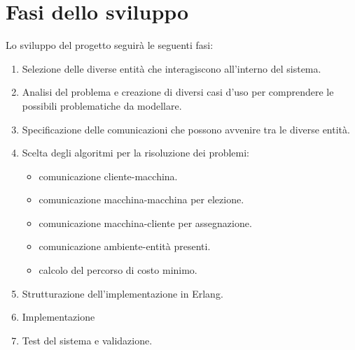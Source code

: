 \section{Fasi dello sviluppo}
Lo sviluppo del progetto seguirà le seguenti fasi:
\begin{enumerate}
	\item Selezione delle diverse entità che interagiscono all'interno del sistema.
	\item Analisi del problema e creazione di diversi casi d'uso per comprendere le possibili problematiche da modellare.
	\item Specificazione delle comunicazioni che possono avvenire tra le diverse entità.
	\item Scelta degli algoritmi per la risoluzione dei problemi: 
		\begin{itemize}
			\item comunicazione cliente-macchina.
			\item comunicazione macchina-macchina per elezione.
			\item comunicazione macchina-cliente per assegnazione.
			\item comunicazione ambiente-entità presenti.
			\item calcolo del percorso di costo minimo.
		\end{itemize}
	\item Strutturazione dell'implementazione in Erlang.
	\item Implementazione
	\item Test del sistema e validazione.
\end{enumerate}
